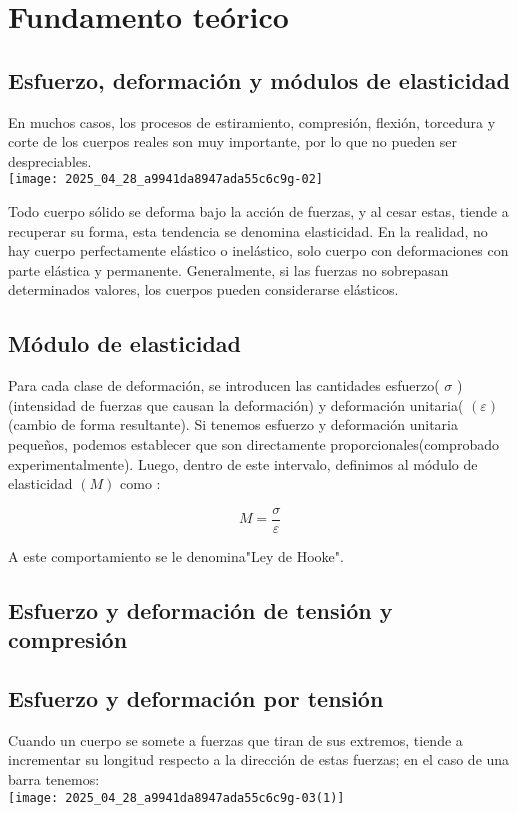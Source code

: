 \section{ Fundamento teórico}
\subsection{ Esfuerzo, deformación y módulos de elasticidad}
En muchos casos, los procesos de estiramiento, compresión, flexión, torcedura y corte de los cuerpos reales son muy importante, por lo que no pueden ser despreciables.\\
\texttt{[image: 2025\_04\_28\_a9941da8947ada55c6c9g-02]}

Todo cuerpo sólido se deforma bajo la acción de fuerzas, y al cesar estas, tiende a recuperar su forma, esta tendencia se denomina elasticidad. En la realidad, no hay cuerpo perfectamente elástico o inelástico, solo cuerpo con deformaciones con parte elástica y permanente. Generalmente, si las fuerzas no sobrepasan determinados valores, los cuerpos pueden considerarse elásticos.

\subsection{ Módulo de elasticidad}
Para cada clase de deformación, se introducen las cantidades esfuerzo( $\sigma$ )(intensidad de fuerzas que causan la deformación) y deformación unitaria( $(\varepsilon)$ (cambio de forma resultante). Si tenemos esfuerzo y deformación unitaria pequeños, podemos establecer que son directamente proporcionales(comprobado experimentalmente). Luego, dentro de este intervalo, definimos al módulo de elasticidad $(M)$ como :


\begin{equation*}
M=\frac{\sigma}{\varepsilon} \tag{1}
\end{equation*}


A este comportamiento se le denomina"Ley de Hooke".

\subsection{ Esfuerzo y deformación de tensión y compresión}
\subsection{ Esfuerzo y deformación por tensión}
Cuando un cuerpo se somete a fuerzas que tiran de sus extremos, tiende a incrementar su longitud respecto a la dirección de estas fuerzas; en el caso de una barra tenemos:\\
\texttt{[image: 2025\_04\_28\_a9941da8947ada55c6c9g-03(1)]}

